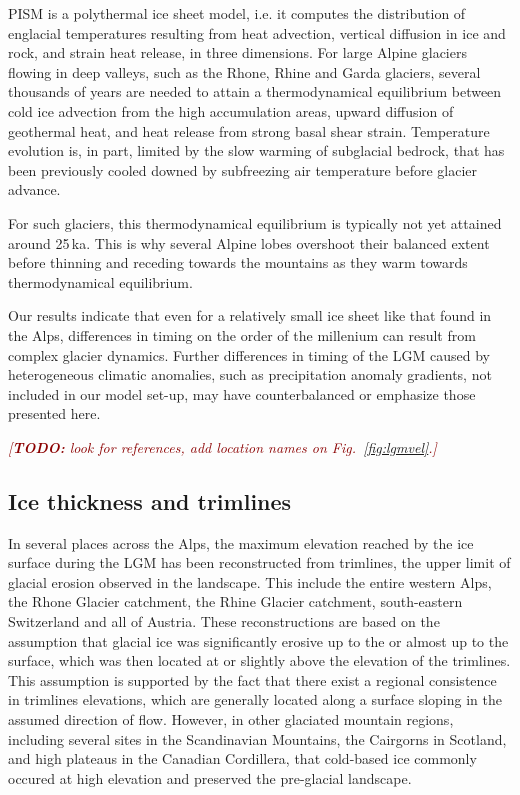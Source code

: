 \documentclass[tc, manuscript]{copernicus}
\newcommand{\todo}[1]{\textcolor{darkred}{\emph{[\textbf{TODO:} #1]}}}
\begin{document}
    PISM is a polythermal ice sheet model, i.e. it computes the distribution
    of englacial temperatures resulting from heat advection, vertical
    diffusion in ice and rock, and strain heat release, in three dimensions.
    For large Alpine glaciers flowing in deep valleys, such as the Rhone,
    Rhine and Garda glaciers, several thousands of years are needed to attain
    a thermodynamical equilibrium between cold ice advection from the high
    accumulation areas, upward diffusion of geothermal heat, and heat release
    from strong basal shear strain. Temperature evolution is, in part, limited
    by the slow warming of subglacial bedrock, that has been previously cooled
    downed by subfreezing air temperature before glacier advance.

    For such glaciers, this thermodynamical equilibrium is typically not yet
    attained around 25\,ka. This is why several Alpine lobes overshoot their
    balanced extent before thinning and receding towards the mountains as they
    warm towards thermodynamical equilibrium.

    Our results indicate that even for a relatively small ice sheet like that
    found in the Alps, differences in timing on the order of the millenium can
    result from complex glacier dynamics. Further differences in timing of the
    LGM caused by heterogeneous climatic anomalies, such as precipitation
    anomaly gradients, not included in our model set-up, may have
    counterbalanced or emphasize those presented here.

    \todo{look for references, add location names on Fig.~\ref{fig:lgmvel}.}


\subsection{Ice thickness and trimlines}
\label{sec:thickness}

    In several places across the Alps, the maximum elevation reached by the
    ice surface during the LGM has been reconstructed from trimlines, the upper
    limit of glacial erosion observed in the landscape. This include the entire
    western Alps, the Rhone Glacier catchment, the Rhine Glacier catchment,
    south-eastern Switzerland and all of Austria. These reconstructions are
    based on the assumption that glacial ice was significantly erosive up to
    the or almost up to the surface, which was then located at or slightly
    above the elevation of the trimlines. This assumption is supported by the
    fact that there exist a regional consistence in trimlines elevations, which
    are generally located along a surface sloping in the assumed direction of
    flow. However, in other glaciated mountain regions, including several
    sites in the Scandinavian Mountains, the Cairgorns in Scotland, and high
    plateaus in the Canadian Cordillera, that cold-based ice commonly occured
    at high elevation and preserved the pre-glacial landscape.
\end{document}
